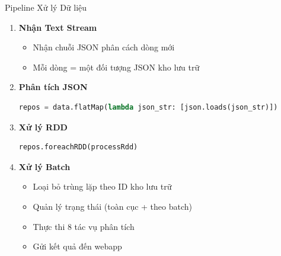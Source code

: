 \documentclass[aspectratio=169]{beamer}
\begin{document}
\begin{frame}{Pipeline Xử lý Dữ liệu}
    \begin{enumerate}
        \item \textbf{Nhận Text Stream}
        \begin{itemize}
            \item Nhận chuỗi JSON phân cách dòng mới
            \item Mỗi dòng = một đối tượng JSON kho lưu trữ
        \end{itemize}
        
        \item \textbf{Phân tích JSON}
        \begin{lstlisting}[language=Python, basicstyle=\tiny]
repos = data.flatMap(lambda json_str: [json.loads(json_str)])
        \end{lstlisting}
        
        \item \textbf{Xử lý RDD}
        \begin{lstlisting}[language=Python, basicstyle=\tiny]
repos.foreachRDD(processRdd)
        \end{lstlisting}
        
        \item \textbf{Xử lý Batch}
        \begin{itemize}
            \item Loại bỏ trùng lặp theo ID kho lưu trữ
            \item Quản lý trạng thái (toàn cục + theo batch)
            \item Thực thi 8 tác vụ phân tích
            \item Gửi kết quả đến webapp
        \end{itemize}
    \end{enumerate}
\end{frame}
\end{document}
